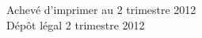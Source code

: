 \cleardoublepage
\mbox{}
\vfill

{\scriptsize
\begin{center}
Achevé d'imprimer au 2 trimestre 2012 \\
Dépôt légal\frcolon{} 2 trimestre 2012
\end{center}
}
\enlargethispage{\footskip}


